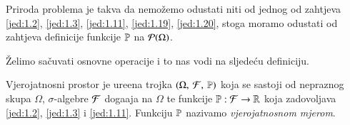 Priroda problema je takva da nemo\v zemo odustati niti od jednog od zahtjeva \eqref{jed:1.2}, \eqref{jed:1.3}, \eqref{jed:1.11}, \eqref{jed:1.19}, \eqref{jed:1.20}, stoga moramo odustati od zahtjeva definicije funkcije $\mathbb{P}$ na $\mathcal{P}({\Omega})$.

\v Zelimo sa\v cuvati osnovne operacije i to nas vodi na sljede\' cu definiciju.

\begin{defn}
    Vjerojatnosni prostor je ure\dj ena trojka $(\Omega, \: \mathcal{F}, \: \mathbb{P})$ koja se sastoji od nepraznog skupa $\Omega$, $\sigma$-algebre $\mathcal{F}$ doga\dj aja na $\Omega$ te funkcije $\mathbb{P}: \mathcal{F} \to \mathbb{R}$ koja zadovoljava \eqref{jed:1.2}, \eqref{jed:1.3} i \eqref{jed:1.11}.
    Funkciju $\mathbb{P}$ nazivamo \emph{vjerojatnosnom mjerom}.
\end{defn}

